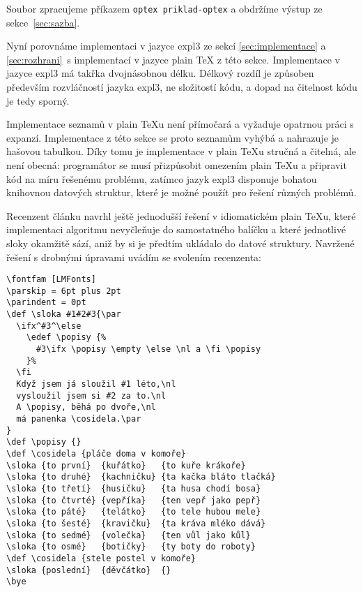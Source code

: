 \documentclass{csbulletin}
\newenvironment{mintedblock}{%
  \par\vspace{\topsep}\vspace{\partopsep}%
  \begingroup
  \fvset{listparameters=\setlength{\topsep}{0pt}\setlength{\partopsep}{0pt}}%
}{%
  \endgroup
  \par\vspace{\topsep}\vspace{\partopsep}%
}
\begin{document}
\begin{mintedblock}
\inputminted[firstnumber=1]{tex}{example-optex.tex}
\end{mintedblock}

\noindent
Soubor zpracujeme příkazem \texttt{optex priklad-optex} a obdržíme výstup ze sekce~\ref{sec:sazba}.

Nyní porovnáme implementaci v jazyce expl3 ze sekcí \ref{sec:implementace} a \ref{sec:rozhrani}\, s implementací v jazyce plain \TeX{} z této sekce. Implementace v jazyce expl3 má takřka dvojnásobnou délku. Délkový rozdíl je způsoben především rozvláčností jazyka expl3, ne složitostí kódu, a dopad na čitelnost kódu je tedy sporný.

Implementace seznamů v plain \TeX u není přímočará a vyžaduje opatrnou práci s expanzí. Implementace z této sekce se proto seznamům vyhýbá a nahrazuje je hašovou tabulkou. Díky tomu je implementace v plain \TeX u stručná a čitelná, ale není obecná: programátor se musí přizpůsobit omezením plain \TeX u a připravit kód na míru řešenému problému, zatímco jazyk expl3 disponuje bohatou knihovnou datových struktur, které je možné použít pro řešení různých problémů.

Recenzent článku navrhl ještě jednodušší řešení v idiomatickém plain \TeX u, které implementaci algoritmu nevyčleňuje do samostatného balíčku a které jednotlivé sloky okamžitě sází, aniž by si je předtím ukládalo do datové struktury. Navržené řešení s drobnými úpravami uvádím se svolením recenzenta:

\begin{mintedblock}
\begin{verbatim}
\fontfam [LMFonts]
\parskip = 6pt plus 2pt
\parindent = 0pt
\def \sloka #1#2#3{\par
  \ifx^#3^\else
    \edef \popisy {%
      #3\ifx \popisy \empty \else \nl a \fi \popisy
    }%
  \fi
  Když jsem já sloužil #1 léto,\nl
  vysloužil jsem si #2 za to.\nl
  A \popisy, běhá po dvoře,\nl
  má panenka \cosidela.\par
}
\def \popisy {}
\def \cosidela {pláče doma v komoře}
\sloka {to první}  {kuřátko}   {to kuře krákoře}
\sloka {to druhé}  {kachničku} {ta kačka bláto tlačká}
\sloka {to třetí}  {husičku}   {ta husa chodí bosa}
\sloka {to čtvrté} {vepříka}   {ten vepř jako pepř}
\sloka {to páté}   {telátko}   {to tele hubou mele}
\sloka {to šesté}  {kravičku}  {ta kráva mléko dává}
\sloka {to sedmé}  {volečka}   {ten vůl jako kůl}
\sloka {to osmé}   {botičky}   {ty boty do roboty}
\def \cosidela {stele postel v komoře}
\sloka {poslední}  {děvčátko}  {}
\bye
\end{verbatim}
\end{mintedblock}
\end{document}
